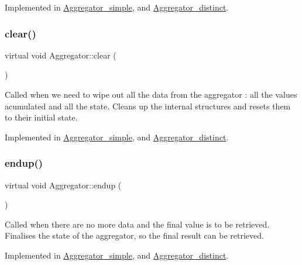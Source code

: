 Implemented in \mbox{\hyperlink{classAggregator__simple_adaa482bd0ba91275f559a4eae95686c0}{Aggregator\+\_\+simple}}, and \mbox{\hyperlink{classAggregator__distinct_a3485cfa42d584711c4c95a3405f4a2ad}{Aggregator\+\_\+distinct}}.

\mbox{\label{classAggregator_ad416a800e9cdec7908dd3e9bdffa70e5}} 
\subsubsection{\texorpdfstring{clear()}{clear()}}
{\footnotesize\ttfamily virtual void Aggregator\+::clear (\begin{DoxyParamCaption}{ }\end{DoxyParamCaption})\hspace{0.3cm}{\ttfamily [pure virtual]}}

Called when we need to wipe out all the data from the aggregator \+: all the values acumulated and all the state. Cleans up the internal structures and resets them to their initial state. 

Implemented in \mbox{\hyperlink{classAggregator__simple_a1bc4a3b483c68b07ac0c2472e868d1a2}{Aggregator\+\_\+simple}}, and \mbox{\hyperlink{classAggregator__distinct_acb3c9529bc839900fc63eb890a5e2aee}{Aggregator\+\_\+distinct}}.

\mbox{\label{classAggregator_a726ef59a61b219b87c0a6041f8162037}} 
\subsubsection{\texorpdfstring{endup()}{endup()}}
{\footnotesize\ttfamily virtual void Aggregator\+::endup (\begin{DoxyParamCaption}{ }\end{DoxyParamCaption})\hspace{0.3cm}{\ttfamily [pure virtual]}}

Called when there are no more data and the final value is to be retrieved. Finalises the state of the aggregator, so the final result can be retrieved. 

Implemented in \mbox{\hyperlink{classAggregator__simple_a57c8435c2131160c58f8c1e6cce37542}{Aggregator\+\_\+simple}}, and \mbox{\hyperlink{classAggregator__distinct_a474d5f42f784572ea3b7d28be0fc3b2e}{Aggregator\+\_\+distinct}}.

